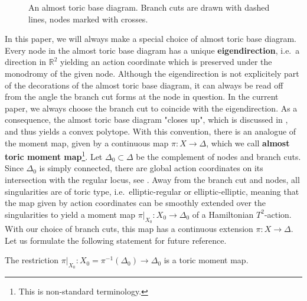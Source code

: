 \documentclass[12pt,a4paper,abstract=true,final]{scrartcl}
\begin{document}
\begin{figure}
  \centering
  \caption{An almost toric base diagram.
Branch cuts are drawn with dashed lines, nodes marked with crosses.}
  \label{fig:atf_example}
\end{figure}

In this paper, we will always make a special choice of almost toric base diagram.
Every node in the almost toric base diagram has a unique \textbf{eigendirection}, i.e.\ a direction in $\mathbb{R}^2$ yielding an action coordinate which is preserved under the monodromy of the given node.
Although the eigendirection is not explicitely part of the decorations of the almost toric base diagram, it can always be read off from the angle the branch cut forms at the node in question.
In the current paper, we always choose the branch cut to coincide with the eigendirection.
As a consequence, the almost toric base diagram "closes up", which is discussed in \cite[Section 7.2]{evans2021atfs}, and thus yields a convex polytope.
With this convention, there is an analogue of the moment map, given by a continuous map $\pi \colon X \rightarrow \Delta$, which we call \textbf{almost toric moment map}\footnote{This is non-standard terminology.}.
Let $\Delta_0 \subset \Delta$ be the complement of nodes and branch cuts.
Since $\Delta_0$ is simply connected, there are global action coordinates on its intersection with the regular locus, see \cite{Dui80}.
Away from the branch cut and nodes, all singularities are of toric type, i.e.\ elliptic-regular or elliptic-elliptic, meaning that the map given by action coordinates can be smoothly extended over the singularities to yield a moment map $\pi\vert_{X_0} \colon X_0 \rightarrow \Delta_0$ of a Hamiltonian $T^2$-action.
With our choice of branch cuts, this map has a continuous extension $\pi \colon X \rightarrow \Delta$.
Let us formulate the following statement for future reference.

\begin{proposition}
    \label{thm:toricmomentmap}
    The restriction $\pi\vert_{X_0} \colon X_0 = \pi^{-1}(\Delta_0) \rightarrow \Delta_0$ is a toric moment map.
\end{proposition}
\end{document}
